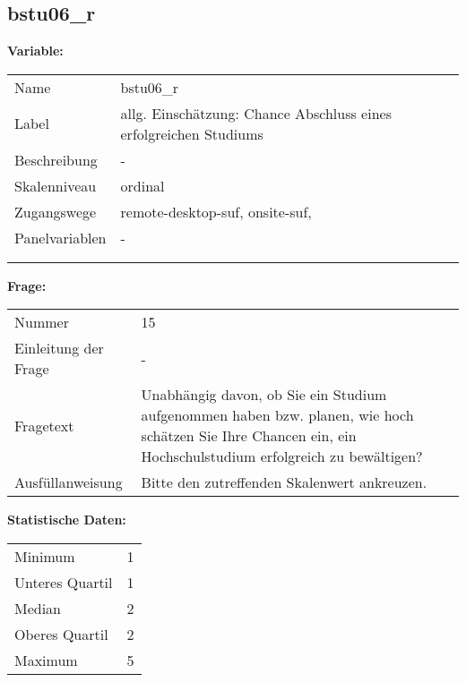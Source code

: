 	
	
	\subsection{bstu06\_r}
	\label{subSection:bstu06_r}

	\noindent\textbf{Variable:}\\
		\begin{tabular}{lL{11.3cm}}
			\label{tableVariable:bstu06_r}
			Name & bstu06\_r \\
			Label & allg. Einschätzung: Chance Abschluss eines erfolgreichen Studiums \\
			Beschreibung & - \\
			Skalenniveau & ordinal \\
			Zugangswege &
				remote-desktop-suf,
				onsite-suf,
 \\
			Panelvariablen & -
			 \\
			 \\
 \\
		\end{tabular}

		\vspace*{1 cm}
		\noindent\textbf{Frage:}\\
		\begin{tabular}{lL{11.3cm}}
			\label{tableQuestion:bstu06_r}
			Nummer & 15 \\
			Einleitung der Frage & - \\
			Fragetext & Unabhängig davon, ob Sie ein Studium aufgenommen haben bzw. planen, wie hoch schätzen Sie Ihre Chancen ein, ein Hochschulstudium erfolgreich zu bewältigen? \\
			Ausfüllanweisung & Bitte den zutreffenden Skalenwert ankreuzen. \\
		\end{tabular}


		\vspace*{1 cm}
		\noindent\textbf{Statistische Daten:}\\
			\begin{tabular}{ll}
				\label{tableStatistics:bstu06_r}
					Minimum & 1 \\
					Unteres Quartil & 1 \\
					Median & 2 \\
					Oberes Quartil & 2 \\
					Maximum & 5 \\
			\end{tabular}



